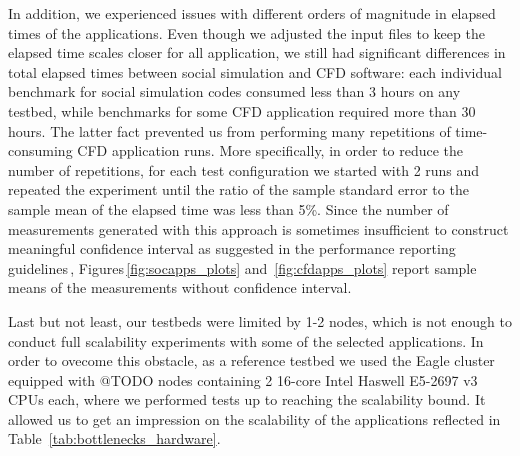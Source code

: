 In addition, we experienced issues with different orders of magnitude in elapsed times of the applications.
Even though we adjusted the input files to keep the elapsed time scales closer for all application,
we still had significant differences in total elapsed times between social simulation and CFD software:
each individual benchmark for social simulation codes consumed less than 3 hours on any testbed,
while benchmarks for some CFD application required more than 30 hours.
The latter fact prevented us from performing many repetitions of time-consuming CFD application runs.
More specifically, in order to reduce the number of repetitions, for each test configuration
we started with 2 runs and repeated the experiment %
until the ratio of the sample standard error to the sample mean of the elapsed time was less than 5\%.
Since the number of measurements generated with this approach
is sometimes insufficient to construct meaningful confidence interval as suggested in the performance reporting guidelines\,\cite{2015:Hoefler},
Figures\,\ref{fig:socapps_plots} and~\ref{fig:cfdapps_plots} report sample means of the measurements without confidence interval.

Last but not least,
our testbeds were limited by 1-2 nodes,
which is not enough to conduct full scalability experiments with some of the selected applications.
In order to ovecome this obstacle,
as a reference testbed we used the Eagle cluster equipped with @TODO nodes containing 2 16-core Intel Haswell E5-2697 v3 CPUs each,
where we performed tests up to reaching the scalability bound.
It allowed us to get an impression on the scalability of the applications reflected in Table~\ref{tab:bottlenecks_hardware}.


